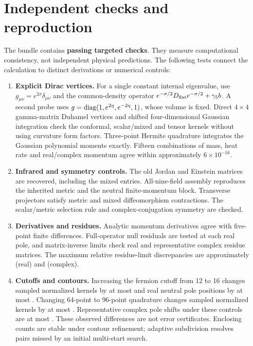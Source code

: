 \section{Independent checks and reproduction}

The bundle contains \textbf{\CheckCount{} passing targeted checks}. They measure computational consistency, not independent physical predictions. The following tests connect the calculation to distinct derivations or numerical controls:
\begin{enumerate}
\item \textbf{Explicit Dirac vertices.} For a single constant internal eigenvalue, use $g_{\mu\nu}=e^{2\sigma}\delta_{\mu\nu}$ and the common-density operator $e^{-\sigma/2}D_{\rm flat}e^{-\sigma/2}+\gamma_5 b$. A second probe uses $g=\operatorname{diag}(1,e^{2\eta},e^{-2\eta},1)$, whose volume is fixed. Direct $4\times4$ gamma-matrix Duhamel vertices and shifted four-dimensional Gaussian integration check the conformal, scalar/mixed and tensor kernels without using curvature form factors. Three-point Hermite quadrature integrates the Gaussian polynomial moments exactly. Fifteen combinations of mass, heat rate and real/complex momentum agree within approximately $6\times10^{-16}$.
\item \textbf{Infrared and symmetry controls.} The old Jordan and Einstein matrices are recovered, including the mixed entries. All-nine-field assembly reproduces the inherited metric and the neutral finite-momentum block. Transverse projectors satisfy metric and mixed diffeomorphism contractions. The scalar/metric selection rule and complex-conjugation symmetry are checked.
\item \textbf{Derivatives and residues.} Analytic momentum derivatives agree with five-point finite differences. Full-operator null residuals are tested at each real pole, and matrix-inverse limits check real and representative complex residue matrices. The maximum relative residue-limit discrepancies are approximately \RealResidueError{} (real) and \ComplexResidueError{} (complex).
\item \textbf{Cutoffs and contours.} Increasing the fermion cutoff from 12 to 16 changes sampled normalized kernels by at most \CutoffError{} and real neutral pole positions by at most \PoleShift{}. Changing 64-point to 96-point quadrature changes sampled normalized kernels by at most \QuadratureError{}. Representative complex pole shifts under these controls are at most \ComplexShift{}. These observed differences are not error certificates. Enclosing counts are stable under contour refinement; adaptive subdivision resolves pairs missed by an initial multi-start search.
\end{enumerate}

